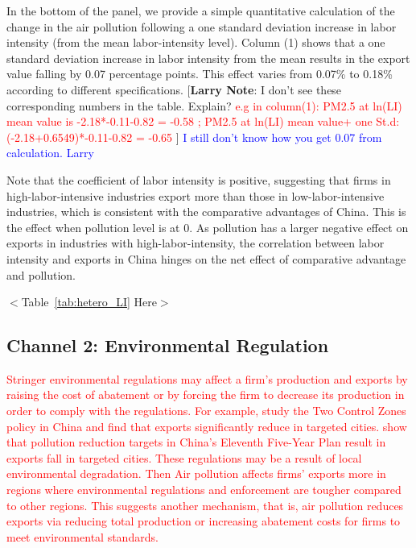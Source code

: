 \documentclass[12pt]{article}
\begin{document}
In the bottom of the panel, we provide a simple quantitative calculation of the change in the air pollution following
a one standard deviation increase in labor intensity (from the mean labor-intensity level). Column (1) shows that a one standard deviation increase in labor intensity from the mean results in the export value falling by 0.07 percentage points. This effect varies from 0.07\% to 0.18\% according to different
specifications.  [\textbf{Larry Note}: I don't see these corresponding
numbers in the table. Explain? \textcolor{red}{e.g in column(1): PM2.5 at ln(LI) mean value is -2.18*-0.11-0.82 = -0.58 ; PM2.5 at ln(LI) mean value+ one St.d: (-2.18+0.6549)*-0.11-0.82 = -0.65 }] \textcolor{blue}{I still don't know how you get 0.07 from calculation. Larry}

Note that the coefficient of labor intensity is positive, suggesting that
firms in high-labor-intensive industries export more than those in
low-labor-intensive industries, which is consistent with the comparative
advantages of China. This is the effect when pollution level is at 0. As
pollution has a larger negative effect on exports in industries with
high-labor-intensity, the correlation between labor intensity and exports
in China hinges on the net effect of comparative advantage and pollution.

\begin{center}
  $<$Table~\ref{tab:hetero_LI} Here$>$
  \end{center}

\subsection{Channel 2: Environmental Regulation}
\label{sec:Channel 2}
\textcolor{red}{Stringer environmental regulations may affect a firm's
production and exports by raising the cost of abatement or by 
forcing the firm to decrease its production in order to comply with the
regulations. For example, \cite%
{hering2014environmental} study the Two Control Zones policy in China and
find that exports significantly reduce in targeted cities. \cite%
{shi2018environmental} show that pollution reduction targets in China's
Eleventh Five-Year Plan result in exports fall in targeted cities. These regulations may be a result of local environmental degradation. Then Air pollution affects firms’ exports more in regions where
environmental regulations and enforcement are tougher compared to other regions. This suggests another mechanism, that is, air pollution reduces
exports via reducing total production or increasing abatement costs for firms to meet
environmental standards.}
\end{document}
